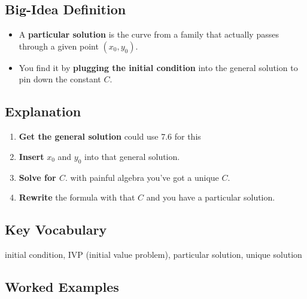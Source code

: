 \documentclass{article}
\begin{document}
\subsection*{Big-Idea Definition}
\begin{itemize}
    In this topic, we’ll learn about the difference between a general solution and a particular solution using separation of variables. It may be helpful to go back and review 7.6.
  \item A \textbf{particular solution} is the curve from a family that actually passes through a given point \((x_0,y_0)\).
  
  \item You find it by \textbf{plugging the initial condition} into the general solution to pin down the constant \(C\).
\end{itemize}

\subsection*{Explanation}
\begin{enumerate}
  \item \textbf{Get the general solution} could use 7.6 for this
  \item \textbf{Insert} \(x_0\) and \(y_0\) into that general solution.
  \item \textbf{Solve for \(C\)}.  
        with painful algebra you’ve got a unique \(C\).
  \item \textbf{Rewrite} the formula with that \(C\) and you have a particular solution.
\end{enumerate}

\subsection*{Key Vocabulary}
initial condition, IVP (initial value problem), particular solution, unique solution

\subsection*{Worked Examples}
\end{document}
